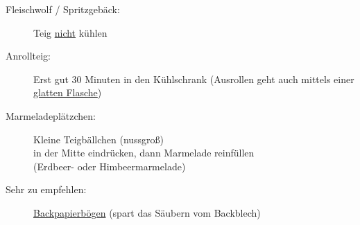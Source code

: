 \documentclass[12pt,utf8,a4paper]{article}
\begin{document}
\begin{description}
\item[Fleischwolf / Spritzgebäck:]
  Teig \underline{nicht} kühlen
\item[Anrollteig:] Erst gut 30
  Minuten in den Kühlschrank
  (Ausrollen geht auch mittels einer
  \underline{glatten Flasche})
\item[Marmeladeplätzchen:] Kleine
  Teigbällchen (nussgroß)\\in der
  Mitte eindrücken, dann Marmelade
  reinfüllen\\(Erdbeer- oder
  Himbeermarmelade)
\item[Sehr zu empfehlen:]
  \underline{Backpapierbögen} (spart
  das Säubern vom Backblech)
\end{description}
\end{document}
